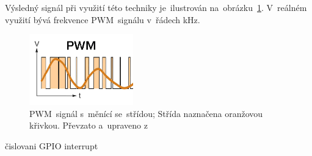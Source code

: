 Výsledný signál při využití této techniky je~ilustrován na~obrázku~\ref{fig:pwm}.  V~reálném využití bývá frekvence  PWM~signálu  v~řádech kHz.

\begin{figure}[htb]
  \centering
  \includegraphics[width=0.4\textwidth]{img/pwm.jpg}
  \caption{\label{fig:pwm}  PWM~signál  s~měnící se~střídou; Střída naznačena oranžovou křivkou. Převzato a~upraveno z~\cite{pwm-image}}
\end{figure}

čislovani GPIO
interrupt

